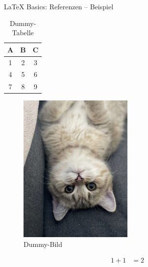 \documentclass[main.tex]{subfiles}
\begin{document}
\begin{frame}{\LaTeX{} Basics: Referenzen -- Beispiel}
	\begin{minipage}[t][][b]{0.49\textwidth}
		\begin{table}[h]
			\centering
			\begin{tabular}{|c|c|c|}
				\hline
				\textbf{A} & \textbf{B} & \textbf{C} \\
				\hline
				1          & 2          & 3          \\
				\hline
				4          & 5          & 6          \\
				\hline
				7          & 8          & 9          \\
				\hline
			\end{tabular}
			\vspace{42pt}
			\caption{Dummy-Tabelle}
			\label{tab:dummy}
		\end{table}
	\end{minipage}
	\begin{minipage}[t][][b]{0.49\textwidth}
		\begin{figure}
			\centering
			\includegraphics[width=0.5\textwidth]{images/DummyCatPicture}
			\caption{Dummy-Bild}
			\label{fig:dummy}
		\end{figure}
	\end{minipage}

	\begin{align}
		1+1 & = 2 \label{eq:dummy}
	\end{align}
\end{frame}
\end{document}
